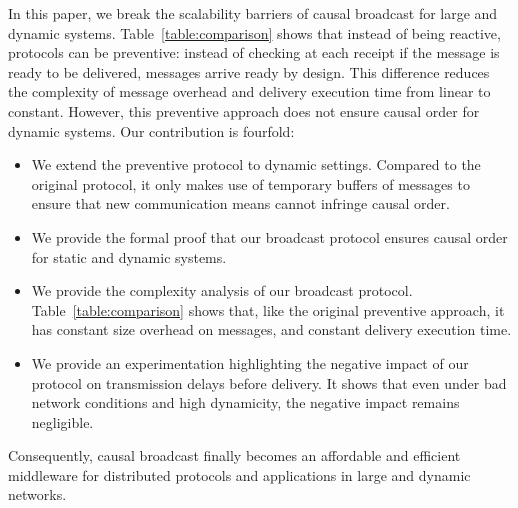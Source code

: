 
In this paper, we break the scalability barriers of causal broadcast for large
and dynamic systems. Table~\ref{table:comparison} shows that instead of being
reactive, protocols can be preventive: instead of checking at each receipt if
the message is ready to be delivered, messages arrive ready by design.
This difference reduces the complexity of message overhead and delivery
execution time from linear to constant.
However, this preventive approach does not ensure causal order for dynamic
systems.
Our contribution is fourfold:
\begin{itemize}
\item We extend the preventive protocol to dynamic settings. Compared to the
  original protocol, it only makes use of temporary buffers of messages to
  ensure that new communication means cannot infringe causal order.
\item We provide the formal proof that our broadcast protocol ensures causal
  order for static and dynamic systems.
\item We provide the complexity analysis of our broadcast
  protocol. Table~\ref{table:comparison} shows that, like the original
  preventive approach, it has constant size overhead on messages, and constant
  delivery execution time.
\item We provide an experimentation highlighting the negative impact of our
  protocol on transmission delays before delivery. It shows that even under bad
  network conditions and high dynamicity, the negative impact remains
  negligible.
\end{itemize}
Consequently, causal broadcast finally becomes an affordable and efficient
middleware for distributed protocols and applications in large and dynamic
networks.

